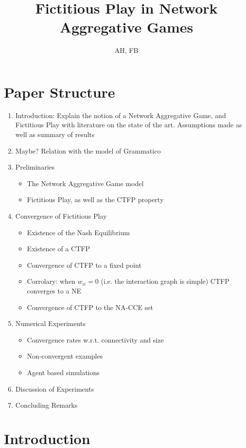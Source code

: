 \documentclass{article}
\title{Fictitious Play in Network Aggregative Games}
\author{AH, FB}
\theoremstyle{definition}
\begin{document}
	
	\maketitle

	\section{Paper Structure}

	\begin{enumerate}
		\item Introduction: Explain the notion of a Network Aggregative Game, and Fictitious Play
		with literature on the state of the art. Assumptions made as well as summary of results
		\item Maybe? Relation with the model of Grammatico
		\item Preliminaries \begin{itemize}
			\item The Network Aggregative Game model
			\item Fictitious Play, as well as the CTFP property
		\end{itemize}
		\item Convergence of Fictitious Play \begin{itemize}
			\item Existence of the Nash Equilibrium
			\item Existence of a CTFP
			\item Convergence of CTFP to a fixed point
			\item Corrolary: when $w_{ii} = 0$ (i.e. the interaction graph is simple) CTFP converges
			to a NE
			\item Convergence of CTFP to the NA-CCE set
		\end{itemize}
		\item Numerical Experiments \begin{itemize}
			\item Convergence rates w.r.t. connectivity and size
			\item Non-convergent examples
			\item Agent based simulations
		\end{itemize}
		\item Discussion of Experiments
		\item Concluding Remarks
	\end{enumerate}
	
	\newpage
	\section{Introduction}
\end{document}
